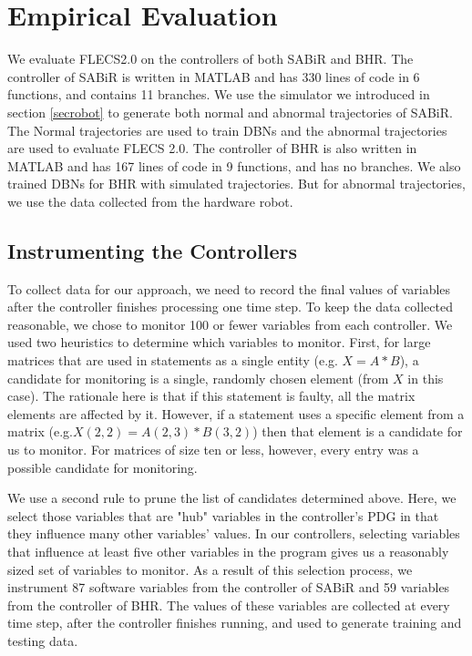 \section{Empirical Evaluation}
We evaluate FLECS2.0 on the controllers of both SABiR and BHR. The controller of SABiR is written in MATLAB and has 330 lines of code in 6 functions, and contains 11 branches. We use the simulator we introduced in section \ref{secrobot} to generate both normal and abnormal trajectories of SABiR. The Normal trajectories are used to train DBNs and the abnormal trajectories are used to evaluate FLECS 2.0. The controller of BHR is also written in MATLAB and has 167 lines of code in 9 functions, and has no branches. We also trained DBNs for BHR with simulated trajectories. But for abnormal trajectories, we use the data collected from the hardware robot.

\subsection{Instrumenting the Controllers}
To collect data for our approach, we need to record the final values of variables after the controller finishes processing one time step. To keep the data collected reasonable, we chose to monitor 100 or fewer variables from each controller. We used two heuristics to determine which variables to monitor. First, for large matrices that are used in statements as a single entity (e.g. $X = A*B$), a candidate for monitoring is a single, randomly chosen element (from $X$ in this case). The rationale here is that if this statement is faulty, all the matrix elements are affected by it. However, if a statement uses a specific element from a matrix (e.g.$X(2, 2) = A(2, 3) * B(3, 2)$) then that element is a candidate for us to monitor. For matrices of size ten or less, however, every entry was a possible candidate for monitoring.

We use a second rule to prune the list of candidates determined above. Here, we select those variables that are "hub" variables in the controller’s PDG in that they influence many other variables' values. In our controllers, selecting variables that influence at least five other variables in the program gives us a reasonably sized set of variables to monitor. As a result of this selection process, we instrument 87 software variables from the controller of SABiR and 59 variables from the controller of BHR. The values of these variables are collected at every time step, after the controller finishes running, and used to generate training and testing data.

